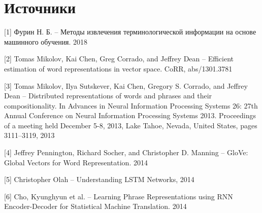
\pagebreak
\section{Источники}

 [1] Фурин Н. Б. -- Методы извлечения терминологической информации на основе
машинного обучения. 2018

 [2] Tomas Mikolov, Kai Chen, Greg Corrado, and Jeffrey Dean -- Efficient estimation
of word representations in vector space. CoRR, abs/1301.3781

 [3] Tomas Mikolov, Ilya Sutskever, Kai Chen, Gregory S. Corrado, and Jeffrey Dean -- Distributed representations of words and phrases and their compositionality. In Advances in Neural Information Processing Systems 26: 27th Annual Conference on Neural Information Processing Systems 2013. Proceedings of a meeting held December 5-8, 2013, Lake Tahoe, Nevada, United States, pages 3111–3119, 2013
 
 [4] Jeffrey Pennington, Richard Socher, and Christopher D. Manning -- GloVe: Global Vectors for Word Representation. 2014
 
 [5] Christopher Olah -- Understanding LSTM Networks, 2014
 
 [6] Cho, Kyunghyun et al. -- Learning Phrase Representations using RNN Encoder-Decoder for Statistical Machine Translation. 2014
 
 
